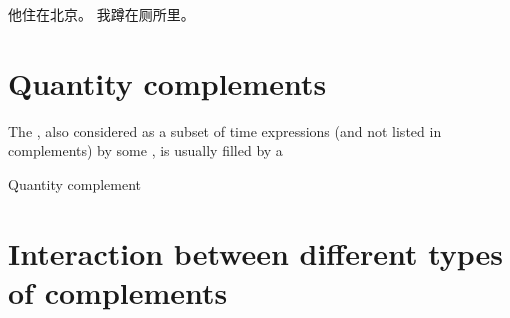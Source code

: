 \documentclass[../main.tex]{subfiles}
\begin{document}
\begin{exe}
    \ex \begin{xlist}
        \ex 他住在北京。
        \ex 我蹲在厕所里。
    \end{xlist}
\end{exe}

\section{Quantity complements}\label{sec:quantity-complement}

The , also considered as a subset of time expressions (and not listed in complements)
by some \citet[sec. 7.2-7.4]{po2015chinese}, is usually filled by a %

Quantity complement 

\section{Interaction between different types of complements}

\end{document}
